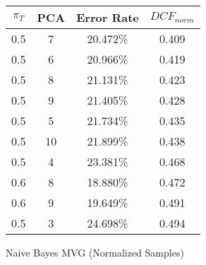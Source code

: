 \begin{tabular}{|c|c|c|c|}
\hline
$\pi_T$ & PCA & Error Rate & $DCF_{norm}$\\
\hline
0.5 & 7 & 20.472\% & 0.409\\
\hline
0.5 & 6 & 20.966\% & 0.419\\
\hline
0.5 & 8 & 21.131\% & 0.423\\
\hline
0.5 & 9 & 21.405\% & 0.428\\
\hline
0.5 & 5 & 21.734\% & 0.435\\
\hline
0.5 & 10 & 21.899\% & 0.438\\
\hline
0.5 & 4 & 23.381\% & 0.468\\
\hline
0.6 & 8 & 18.880\% & 0.472\\
\hline
0.6 & 9 & 19.649\% & 0.491\\
\hline
0.5 & 3 & 24.698\% & 0.494\\
\hline
\end{tabular}
\caption{Naive Bayes MVG (Normalized Samples)}\label{tab:mvgn_naiveacctable}
